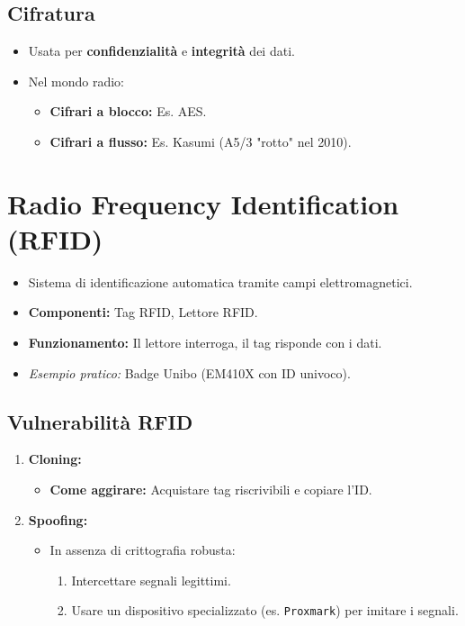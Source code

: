 \subsection{Cifratura}
\begin{itemize}
    \item Usata per \textbf{confidenzialità} e \textbf{integrità} dei dati.
    \item Nel mondo radio:
    \begin{itemize}
        \item \textbf{Cifrari a blocco:} Es. AES.
        \item \textbf{Cifrari a flusso:} Es. Kasumi (A5/3 "rotto" nel 2010).
    \end{itemize}
\end{itemize}

\section{Radio Frequency Identification (RFID)}
\begin{itemize}
    \item Sistema di identificazione automatica tramite campi elettromagnetici.
    \item \textbf{Componenti:} Tag RFID, Lettore RFID.
    \item \textbf{Funzionamento:} Il lettore interroga, il tag risponde con i dati.
    \item \textit{Esempio pratico:} Badge Unibo (EM410X con ID univoco).
\end{itemize}

\subsection{Vulnerabilità RFID}
\begin{enumerate}
    \item \textbf{Cloning:}
    \begin{itemize}
        \item \textbf{Come aggirare:} Acquistare tag riscrivibili e copiare l'ID.
    \end{itemize}
    \item \textbf{Spoofing:}
    \begin{itemize}
        \item In assenza di crittografia robusta:
        \begin{enumerate}
            \item Intercettare segnali legittimi.
            \item Usare un dispositivo specializzato (es. \texttt{Proxmark}) per imitare i segnali.
        \end{enumerate}
    \end{itemize}
\end{enumerate}

